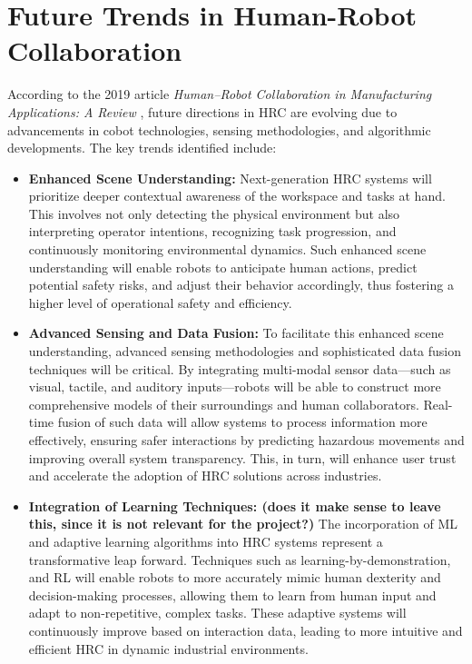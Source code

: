 

\section{Future Trends in Human-Robot Collaboration}

According to the 2019 article \textit{Human–Robot Collaboration in Manufacturing Applications: A Review} \cite{robotics8040100}, future directions in 
\ac{HRC} are evolving due to advancements in cobot technologies, sensing methodologies, and algorithmic developments. The key trends identified include:

\begin{itemize}
    \item \textbf{Enhanced Scene Understanding:} Next-generation \ac{HRC} systems will prioritize deeper contextual awareness of the workspace and tasks at hand. This involves not only detecting the physical environment but also interpreting operator intentions, recognizing task progression, and continuously monitoring environmental dynamics. Such enhanced scene understanding will enable robots to anticipate human actions, predict potential safety risks, and adjust their behavior accordingly, thus fostering a higher level of operational safety and efficiency.

    \item \textbf{Advanced Sensing and Data Fusion:} To facilitate this enhanced scene understanding, advanced sensing methodologies and sophisticated data fusion techniques will be critical. By integrating multi-modal sensor data—such as visual, tactile, and auditory inputs—robots will be able to construct more comprehensive models of their surroundings and human collaborators. Real-time fusion of such data will allow systems to process information more effectively, ensuring safer interactions by predicting hazardous movements and improving overall system transparency. This, in turn, will enhance user trust and accelerate the adoption of \ac{HRC} solutions across industries.

    \item \textbf{Integration of Learning Techniques: (does it make sense to leave this, since it is not relevant for the project?)} 
    The incorporation of \ac{ML} and adaptive learning algorithms into \ac{HRC} systems represent a transformative leap forward. Techniques such as learning-by-demonstration, and \ac{RL} will enable robots to more accurately mimic human dexterity and decision-making processes, allowing them to learn from human input and adapt to non-repetitive, complex tasks. These adaptive systems will continuously improve based on interaction data, leading to more intuitive and efficient \ac{HRC} in dynamic industrial environments.


\end{itemize}
